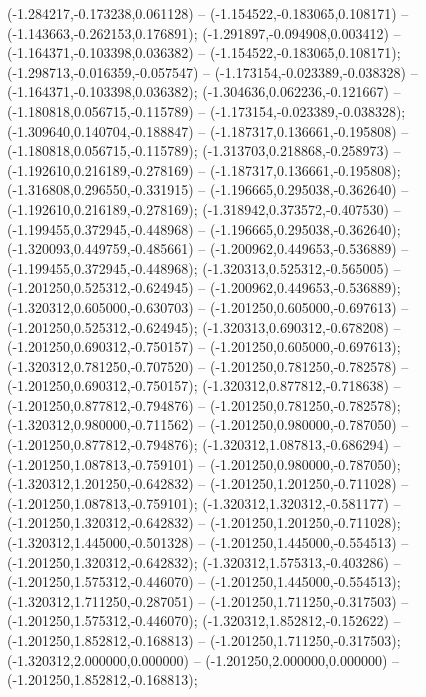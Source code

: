  (-1.284217,-0.173238,0.061128) -- (-1.154522,-0.183065,0.108171) -- (-1.143663,-0.262153,0.176891);
 (-1.291897,-0.094908,0.003412) -- (-1.164371,-0.103398,0.036382) -- (-1.154522,-0.183065,0.108171);
 (-1.298713,-0.016359,-0.057547) -- (-1.173154,-0.023389,-0.038328) -- (-1.164371,-0.103398,0.036382);
 (-1.304636,0.062236,-0.121667) -- (-1.180818,0.056715,-0.115789) -- (-1.173154,-0.023389,-0.038328);
 (-1.309640,0.140704,-0.188847) -- (-1.187317,0.136661,-0.195808) -- (-1.180818,0.056715,-0.115789);
 (-1.313703,0.218868,-0.258973) -- (-1.192610,0.216189,-0.278169) -- (-1.187317,0.136661,-0.195808);
 (-1.316808,0.296550,-0.331915) -- (-1.196665,0.295038,-0.362640) -- (-1.192610,0.216189,-0.278169);
 (-1.318942,0.373572,-0.407530) -- (-1.199455,0.372945,-0.448968) -- (-1.196665,0.295038,-0.362640);
 (-1.320093,0.449759,-0.485661) -- (-1.200962,0.449653,-0.536889) -- (-1.199455,0.372945,-0.448968);
 (-1.320313,0.525312,-0.565005) -- (-1.201250,0.525312,-0.624945) -- (-1.200962,0.449653,-0.536889);
 (-1.320312,0.605000,-0.630703) -- (-1.201250,0.605000,-0.697613) -- (-1.201250,0.525312,-0.624945);
 (-1.320313,0.690312,-0.678208) -- (-1.201250,0.690312,-0.750157) -- (-1.201250,0.605000,-0.697613);
 (-1.320312,0.781250,-0.707520) -- (-1.201250,0.781250,-0.782578) -- (-1.201250,0.690312,-0.750157);
 (-1.320312,0.877812,-0.718638) -- (-1.201250,0.877812,-0.794876) -- (-1.201250,0.781250,-0.782578);
 (-1.320312,0.980000,-0.711562) -- (-1.201250,0.980000,-0.787050) -- (-1.201250,0.877812,-0.794876);
 (-1.320312,1.087813,-0.686294) -- (-1.201250,1.087813,-0.759101) -- (-1.201250,0.980000,-0.787050);
 (-1.320312,1.201250,-0.642832) -- (-1.201250,1.201250,-0.711028) -- (-1.201250,1.087813,-0.759101);
 (-1.320312,1.320312,-0.581177) -- (-1.201250,1.320312,-0.642832) -- (-1.201250,1.201250,-0.711028);
 (-1.320312,1.445000,-0.501328) -- (-1.201250,1.445000,-0.554513) -- (-1.201250,1.320312,-0.642832);
 (-1.320312,1.575313,-0.403286) -- (-1.201250,1.575312,-0.446070) -- (-1.201250,1.445000,-0.554513);
 (-1.320312,1.711250,-0.287051) -- (-1.201250,1.711250,-0.317503) -- (-1.201250,1.575312,-0.446070);
 (-1.320312,1.852812,-0.152622) -- (-1.201250,1.852812,-0.168813) -- (-1.201250,1.711250,-0.317503);
 (-1.320312,2.000000,0.000000) -- (-1.201250,2.000000,0.000000) -- (-1.201250,1.852812,-0.168813);

